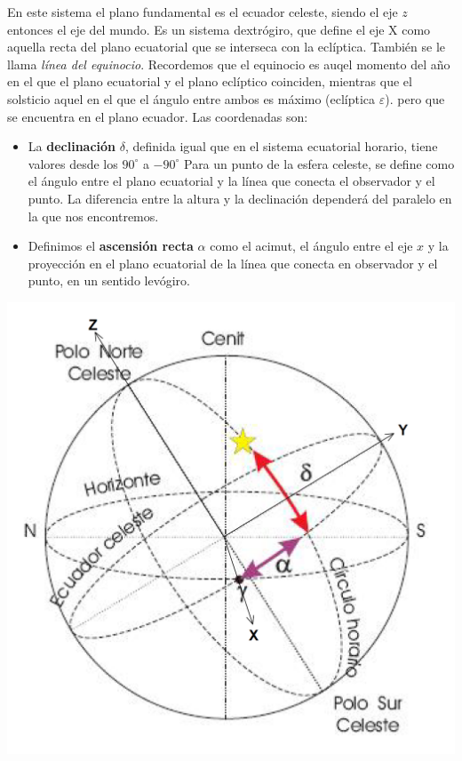 En este sistema el plano fundamental es el ecuador celeste, siendo el eje $z$ entonces el eje del mundo. Es un sistema dextrógiro, que define el eje X como aquella recta del plano ecuatorial que se interseca con la eclíptica. También se le llama \textit{línea del equinocio}. Recordemos que el equinocio es auqel momento del año en el que el plano ecuatorial y el plano eclíptico coinciden, mientras que el solsticio aquel en el que el ángulo entre ambos es máximo (eclíptica $\varepsilon$). pero que se encuentra en el plano ecuador. Las coordenadas son:

\hspace{-8.0mm} \vspace{1.0mm} \begin{minipage}{0.6\textwidth}
\begin{itemize}
	\item La \textbf{declinación} $\delta$, definida igual que en el sistema ecuatorial horario, tiene valores desde los $90^\circ$ a $-90^\circ$ Para un punto de la esfera celeste, se define como el ángulo entre el plano ecuatorial y la línea que conecta el observador y el punto. La diferencia entre la altura y la declinación dependerá del paralelo en la que nos encontremos. 
	\item Definimos el \textbf{ascensión recta} $\alpha$ como el acimut, el ángulo entre el eje $x$ y la proyección en el plano ecuatorial de la línea que conecta en observador y el punto, en un sentido levógiro. 
\end{itemize}
\end{minipage}	\hfill
\begin{minipage}{0.35\textwidth} \centering
\includegraphics[width=1\textwidth]{Cuerpo/Imagenes/01_Ecuatoriales_Absolutas.png}	
\end{minipage}	



